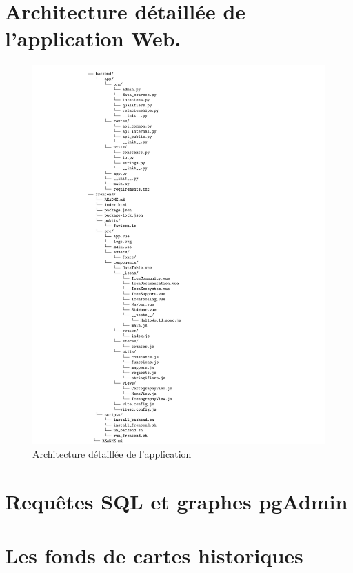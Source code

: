 \documentclass[openany, a4paper, 12pt, twoside]{book}
\begin{document}
\newpage
\appendix 
\chapter{Architecture détaillée de l'application Web.}
\begin{figure}
\centering
    \includegraphics[width=1.1\linewidth]{annexes/architecture_appli.png}
    \caption{Architecture détaillée de l'application}
    \label{fig:archi-détaillée}
\end{figure}
\chapter{Requêtes SQL et graphes pgAdmin}\label{chapter:sql}

\chapter{Les fonds de cartes historiques}

\newpage{\pagestyle{empty}\cleardoublepage}
\end{document}
